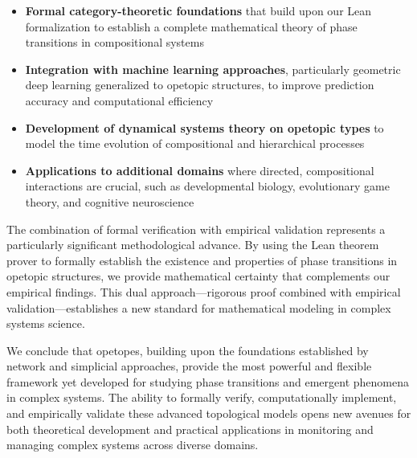 \begin{itemize}[leftmargin=*]
  \item \textbf{Formal category-theoretic foundations} that build upon our Lean formalization to establish a complete mathematical theory of phase transitions in compositional systems
  
  \item \textbf{Integration with machine learning approaches}, particularly geometric deep learning generalized to opetopic structures, to improve prediction accuracy and computational efficiency
  
  \item \textbf{Development of dynamical systems theory on opetopic types} to model the time evolution of compositional and hierarchical processes
  
  \item \textbf{Applications to additional domains} where directed, compositional interactions are crucial, such as developmental biology, evolutionary game theory, and cognitive neuroscience
\end{itemize}

The combination of formal verification with empirical validation represents a particularly significant methodological advance. By using the Lean theorem prover to formally establish the existence and properties of phase transitions in opetopic structures, we provide mathematical certainty that complements our empirical findings. This dual approach—rigorous proof combined with empirical validation—establishes a new standard for mathematical modeling in complex systems science.

We conclude that opetopes, building upon the foundations established by network and simplicial approaches, provide the most powerful and flexible framework yet developed for studying phase transitions and emergent phenomena in complex systems. The ability to formally verify, computationally implement, and empirically validate these advanced topological models opens new avenues for both theoretical development and practical applications in monitoring and managing complex systems across diverse domains.